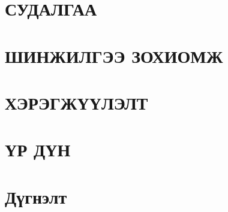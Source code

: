 
\chapter{СУДАЛГАА}


\chapter{ШИНЖИЛГЭЭ ЗОХИОМЖ}


\chapter{ХЭРЭГЖҮҮЛЭЛТ}


% 

\chapter{ҮР ДҮН}


\chapter{Дүгнэлт}

